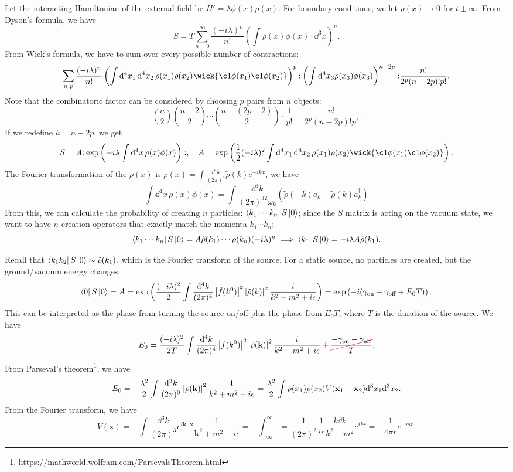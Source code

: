 \documentclass{article}
\begin{document}
Let the interacting Hamiltonian of the external field be $H'=\lambda\phi(x)\rho(x)$. For boundary conditions, we let $\rho(x)\to 0$ for $t\pm\infty$. From Dyson's formula, we have 
$$S=T\sum^\infty_{n=0}\frac{(-i\lambda)^n}{n!}\left(\int\rho(x)\phi(x)\cdot\dd^3x\right)^n.$$ 
From Wick's formula, we have to sum over every possible number of contractions:
$$\sum_{n,p}\frac{(-i\lambda)^n}{n!}\left(\int\dd^4x_1\,\dd^4x_2\,\rho(x_1)\rho(x_2)\wick{\c1\phi(x_1)\c1\phi(x_2)}\right)^p\normord{\left(\int\dd^4x_3\rho(x_3)\phi(x_3)\right)^{n-2p}}\frac{n!}{2^p(n-2p)!p!}.$$
Note that the combinatoric factor can be considered by choosing $p$ pairs from $n$ objects:
$$\binom n2\binom{n-2}2\cdots\binom{n-(2p-2)}2\cdot\frac 1{p!}=\frac{n!}{2^p(n-2p)!p!}.$$
If we redefine $k=n-2p$, we get 
$$S=A\normord{\exp\left(-i\lambda\int\dd^4x\,\rho(x)\phi(x)\right)},\quad A=\exp\left(\frac 12(-i\lambda)^2\int\dd^4x_1\,\dd^4x_2\,\rho(x_1)\rho(x_2)\wick{\c1\phi(x_1)\c1\phi(x_2)}\right).$$
The Fourier transformation of the $\rho(x)$ is $\rho(x)=\int\frac{\dd^4k}{(2\pi)^4}\tilde\rho(k)e^{-ikx}$, we have 
$$\int\dd^4x\,\rho(x)\phi(x)=\int\frac{\dd^3k}{(2\pi)^32\omega_k}(\tilde\rho(-k)a_k+\tilde\rho(k)a^\dag_k)$$
From this, we can calculate the probability of creating $n$ particles: $\bra{k_1\cdots k_n}S\ket 0$; since the $S$ matrix is acting on the vacuum state, we want to have $n$ creation operators that exactly match the momenta $k_1\cdots k_n$; 
$$\bra{k_1\cdots k_n}S\ket 0=A\tilde\rho(k_1)\cdots\rho(k_n)(-i\lambda)^n\implies\bra{k_1}S\ket 0=-i\lambda A\tilde\rho(k_1).$$

Recall that $\bra{k_1k_2}S\ket 0\sim\tilde\rho(k_1)$, which is the Fourier transform of the source. For a static source, no particles are created, but the ground/vacuum energy changes:
$$\bra 0S\ket 0=A=\exp\left(\frac{(-i\lambda)^2}{2}\int\frac{\dd^4k}{(2\pi)^4}\left\lvert\tilde f(k^0)\right\rvert^2\left\lvert\tilde\rho(k)\right\rvert^2\frac{i}{k^2-m^2+i\epsilon}\right)=\exp\left(-i(\gamma_\text{on}+\gamma_\text{off}+E_0T)\right).$$
This can be interpreted as the phase from turning the source on/off plus the phase from $E_0T$, where $T$ is the duration of the source. We have 
$$E_0=\frac{(-i\lambda)^2}{2T}\int\frac{\dd^4k}{(2\pi)^4}\abs{f(k^0)}^2\abs{\tilde\rho(\mathbf k)}^2\frac{i}{k^2-m^2+i\epsilon}+\Ccancel[red]{\frac{-\gamma_\text{on}-\gamma_\text{off}}{T}}.$$
From Parseval's theorem\footnote{\url{https://mathworld.wolfram.com/ParsevalsTheorem.html}}, we have 
$$E_0=-\frac{\lambda^2}{2}\int\frac{\dd^3k}{(2\pi)^0}\left\lvert\rho(\mathbf k)\right\rvert^2\frac 1{k^2+m^2-i\epsilon}=\frac{\lambda^2}2\int\rho(x_1)\rho(x_2)V(\mathbf x_1-\mathbf x_2)\dd^3x_1\dd^3x_2.$$
From the Fourier transform, we have 
$$V(\mathbf x)=-\int\frac{\dd^3k}{(2\pi)^3}e^{i\mathbf k\cdot\mathbf x}\frac 1{\mathbf k^2+m^2-i\epsilon}=-\int^\infty_{-\infty}=\frac 1{(2\pi)^2}\frac 1{ir}\frac{k\dd k}{k^2+m^2}e^{ikr}=-\frac 1{4\pi r}e^{-mr}.$$
\end{document}
